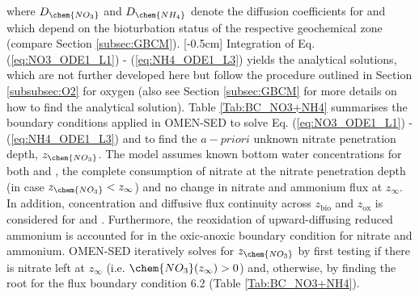 \documentclass[gmd, manuscript]{copernicus}
\begin{document}
where $D_\chem{NO_3}$ and $D_{\chem{NH_4}}$ denote the diffusion coefficients for  and  which depend on the bioturbation status of the respective geochemical zone (compare Section \ref{subsec:GBCM}). 
[-0.5cm]%
Integration of Eq. (\ref{eq:NO3_ODE1_L1}) - (\ref{eq:NH4_ODE1_L3}) yields the analytical solutions, which are not further developed here but follow the procedure outlined in Section \ref{subsubsec:O2} for oxygen 
(also see Section \ref{subsec:GBCM} for more details on how to find the analytical solution). Table \ref{Tab:BC_NO3+NH4} summarises the boundary conditions applied in OMEN-SED to solve Eq. (\ref{eq:NO3_ODE1_L1}) - (\ref{eq:NH4_ODE1_L3}) 
and to find the $a-priori$ unknown nitrate penetration depth, $z_\chem{NO_3}$. 
The model assumes known bottom water concentrations for both  and , the complete consumption of nitrate at the nitrate penetration depth (in case  $z_{\chem{NO_3}} < z_\infty$) and no change in nitrate and ammonium 
flux at $z_\infty$. In addition, concentration and diffusive flux continuity across $z_{\mathrm{bio}}$ and $z_{\mathrm{ox}}$ is considered for  and . 
Furthermore, the reoxidation of upward-diffusing reduced ammonium is accounted for in the oxic-anoxic boundary condition for nitrate and ammonium. 
OMEN-SED iteratively solves for $z_{\chem{NO_3}}$ by first testing if there is nitrate left at $z_\infty$ (i.e. $\chem{NO_3}(z_\infty) > 0$) and, otherwise, by finding the root for the flux 
boundary condition 6.2 (Table \ref{Tab:BC_NO3+NH4}).
\end{document}
